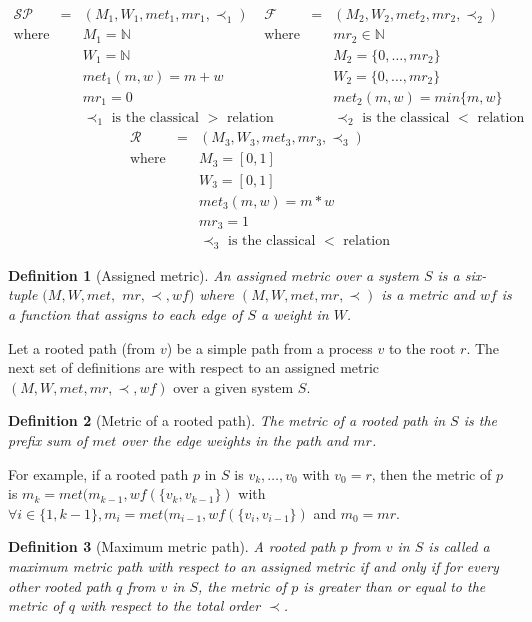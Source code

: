 \documentclass[11pt]{article}
\newtheorem{defi}{Definition}
\newenvironment{definition}[1]{\vspace{-0.25cm}\begin{defi}#1}{\end{defi}\vspace{-0.3cm}}
\begin{document}
\[\begin{array}{rclrcl}
\mathcal{SP}&=&(M_1,W_1,met_1,mr_1,\prec_1)&\mathcal{F}&=&(M_2,W_2,met_2,mr_2,\prec_2)\\
\text{where}& & M_1=\mathbb{N}&\text{where}& & mr_2\in\mathbb{N}\\
&& W_1=\mathbb{N}&&& M_2=\{0,\ldots,mr_2\}\\
&& met_1(m,w)=m+w&&& W_2=\{0,\ldots,mr_2\}\\
&& mr_1=0&&& met_2(m,w)=min\{m,w\}\\
&& \prec_1 \text{ is the classical }>\text{ relation}&&& \prec_2 \text{ is the classical }<\text{ relation}
\end{array}\]
\[\begin{array}{rcl}
\mathcal{R}&=&(M_3,W_3,met_3,mr_3,\prec_3)\\
\text{where}& & M_3=[0,1]\\
&& W_3=[0,1]\\
&& met_3(m,w)=m*w\\
&& mr_3=1\\
&& \prec_3 \text{ is the classical }<\text{ relation}
\end{array}\]

\begin{definition}[Assigned metric]
An \emph{assigned metric} over a system $S$ is a six-tuple $(M,W,met,$ $mr,\prec,wf)$ where $(M,W,met,mr,\prec)$ is a metric and $wf$ is a function that assigns to each edge of $S$ a weight in $W$.
\end{definition}

Let a rooted path (from $v$) be a simple path from a process $v$ to the root $r$. The next set of definitions are with respect to an assigned metric $(M,W,met,mr,\prec,wf)$ over a given system $S$.

\begin{definition}[Metric of a rooted path]
The \emph{metric of a rooted path} in $S$ is the prefix sum of $met$ over the edge weights in the path and $mr$.
\end{definition}

For example, if a rooted path $p$ in $S$ is $v_k,\ldots,v_0$ with $v_0=r$, then the metric of $p$ is $m_k=met(m_{k-1},wf(\{v_k,v_{k-1}\})$ with $\forall i\in\{1,k-1\},m_i=met(m_{i-1},wf(\{v_i,v_{i-1}\})$ and $m_0=mr$.

\begin{definition}[Maximum metric path]
A rooted path $p$ from $v$ in $S$ is called a \emph{maximum metric path} with respect to an assigned metric if and only if for every other rooted path $q$ from $v$ in $S$, the metric of $p$ is greater than or equal to the metric of $q$ with respect to the total order $\prec$. 
\end{definition}
 
\end{document}
